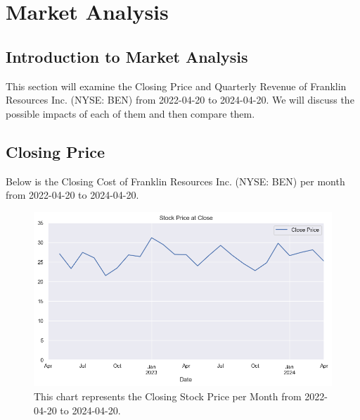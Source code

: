 \documentclass[9pt,a4paper,twoside]{tau}
\begin{document}
\section{Market Analysis}
    \subsection{Introduction to Market Analysis}
        
        This section will examine the Closing Price and Quarterly Revenue of Franklin Resources Inc. (NYSE: BEN) from 2022-04-20 to 2024-04-20. We will discuss the possible impacts of each of them and then compare them.
    
    \subsection{Closing Price}
        
        Below is the Closing Cost of Franklin Resources Inc. (NYSE: BEN) per month from 2022-04-20 to 2024-04-20.
            \begin{figure}[H]
                \centering
                \includegraphics[width=0.85\columnwidth]{images/CloseDataSet1mo.png}
                \caption{This chart represents the Closing Stock Price per Month from 2022-04-20 to 2024-04-20.}
                \label{fig:figure}
            \end{figure}
        
\end{document}
